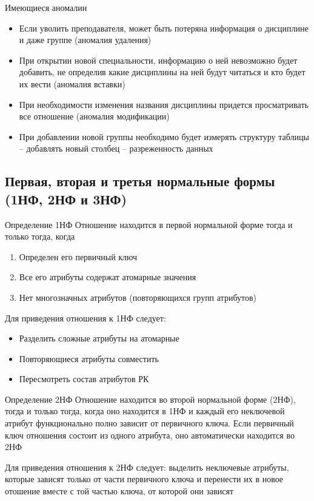 \documentclass[12pt]{article}
\begin{document}
\begin{nota}{Имеющиеся аномалии}
    \begin{itemize}
        \item Если уволить преподавателя, может быть потеряна информация о дисциплине и даже группе (аномалия удаления)
        \item При открытии новой специальности, информацию о ней невозможно будет добавить, не определив какие дисциплины на ней будут читаться и кто будет их вести (аномалия вставки)
        \item При необходимости изменения названия дисциплины придется просматривать все отношение (аномалия модификации)
        \item При добавлении новой группы необходимо будет измерять структуру таблицы -- добавлять новый столбец -- разреженность данных 
    \end{itemize}
\end{nota}

\newpage

\subsection{Первая, вторая и третья нормальные формы (1НФ, 2НФ и 3НФ)}

\begin{defin}{Определение 1НФ}
    Отношение находится в первой нормальной форме тогда и только тогда, когда 

    \begin{enumerate}
        \item Определен его первичный ключ 
        \item Все его атрибуты содержат атомарные значения
        \item Нет многозначных атрибутов (повторяющихся групп атрибутов)
    \end{enumerate}

    Для приведения отношения к 1НФ следует: 

    \begin{itemize}
        \item Разделить сложные атрибуты на атомарные 
        \item Повторяющиеся атрибуты совместить 
        \item Пересмотреть состав атрибутов РК 
    \end{itemize}
\end{defin}

\begin{defin}{Определение 2НФ}
    Отношение находится во второй нормальной форме (2НФ), тогда и только тогда, когда оно находится в 1НФ и каждый его неключевой атрибут функционально полно зависит от первичного ключа. Если первичный ключ отношения состоит из одного атрибута, оно автоматически находится во 2НФ 

    Для приведения отношения к 2НФ следует: выделить неключевые атрибуты, которые зависят только от части первичного ключа и перенести их в новое отошение вместе с той частью ключа, от которой они зависят
\end{defin}
\end{document}
